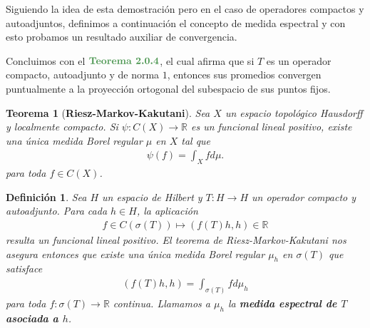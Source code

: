 \documentclass[11pt]{report}
\theoremstyle{colored}
\newtheorem{definition}{Definición}[section]
\newtheorem*{theorem*}{Teorema}
\newcommand{\R}{\mathbb{R}}
\newcommand{\ip}[1]{( #1 )}
\newcommand{\paint}[1]{\color{color}{#1}}
\newcommand{\tpaint}[1]{\paint{\textbf{#1}}}
\begin{document}
Siguiendo la idea de esta demostración pero en el caso de operadores compactos y autoadjuntos, definimos a continuación el concepto de medida espectral y con esto probamos un resultado auxiliar de convergencia. 

Concluimos con el $\tpaint{Teorema 2.0.4}$, el cual afirma que si $T$ es un operador compacto, autoadjunto y de norma $1$, entonces sus promedios convergen puntualmente a la proyección ortogonal del subespacio de sus puntos fijos.
\\
\begin{tcolorbox}
\begin{theorem*}[\textbf{Riesz-Markov-Kakutani}] Sea $X$ un espacio topológico Hausdorff y localmente compacto. Si $\psi : C(X) \to \R$ es un funcional lineal positivo, existe una única medida Borel regular $\mu$ en $X$ tal que
\begin{align*}
\psi(f) = \int_X f d\mu.
\end{align*}
para toda $f \in C(X)$.
\end{theorem*}
\end{tcolorbox}

\begin{definition} Sea $H$ un espacio de Hilbert y $T : H \to H$ un operador compacto y autoadjunto. Para cada $h \in H$, la aplicación 
\begin{align*}
f \in C(\sigma(T)) \mapsto \ip{f(T)h,h} \in \R
\end{align*}
resulta un funcional lineal positivo. El teorema de Riesz-Markov-Kakutani nos asegura entonces que existe una única medida Borel regular $\mu_h$ en $\sigma(T)$ que satisface
\begin{align*}
\ip{f(T)h,h} = \int_{\sigma(T)} f d\mu_h
\end{align*}
para toda $f : \sigma(T) \to \R$ continua. Llamamos a $\mu_h$ la \textbf{medida espectral de $T$ asociada a $h$}.
\end{definition}
\end{document}
